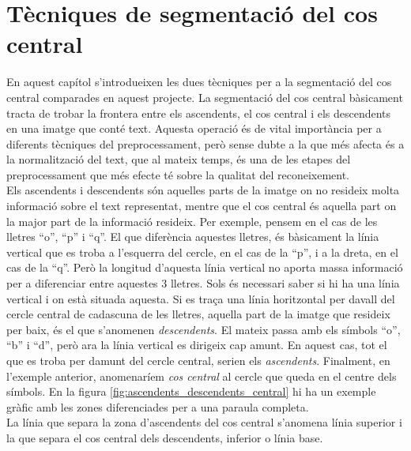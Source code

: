 \chapter{Tècniques de segmentació del cos central}
\label{cap:seg}
En aquest capítol s'introdueixen les dues tècniques per a la segmentació del cos central comparades en aquest projecte. La segmentació del cos central bàsicament tracta de trobar la frontera entre els ascendents, el cos central i els descendents en una imatge que conté text. Aquesta operació és de vital importància per a diferents tècniques del preprocessament, però sense dubte a la que més afecta és a la normalització del text, que al mateix temps, és una de les etapes del preprocessament que més efecte té sobre la qualitat del reconeixement. \\

Els ascendents i descendents són aquelles parts de la imatge on no resideix molta informació sobre el text representat, mentre que el cos central és aquella part on la major part de la informació resideix. Per exemple, pensem en el cas de les lletres ``o'', ``p'' i ``q''. El que diferència aquestes lletres, és bàsicament la línia vertical que es troba a l'esquerra del cercle, en el cas de la ``p'', i a la dreta, en el cas de la ``q''. Però la longitud d'aquesta línia vertical no aporta massa informació per a diferenciar entre aquestes 3 lletres. Sols és necessari saber si hi ha una línia vertical i on està situada aquesta. Si es traça una línia horitzontal per davall del cercle central de cadascuna de les lletres, aquella part de la imatge que resideix per baix, és el que s'anomenen \emph{descendents}. El mateix passa amb els símbols ``o'', ``b'' i ``d'', però ara la línia vertical es dirigeix cap amunt. En aquest cas, tot el que es troba per damunt del cercle central, serien els \emph{ascendents}. Finalment, en l'exemple anterior, anomenaríem \emph{cos central} al cercle que queda en el centre dels símbols. En la figura \ref{fig:ascendents_descendents_central} hi ha un exemple gràfic amb les zones diferenciades per a una paraula completa. \\

La línia que separa la zona d'ascendents del cos central s'anomena línia superior i la que separa el cos central dels descendents, inferior o línia base. \\

